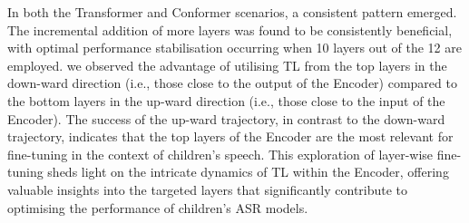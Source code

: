 In both the Transformer and Conformer scenarios, a consistent pattern emerged. The incremental addition of more layers was found to be consistently beneficial, with optimal performance stabilisation occurring when 10 layers out of the 12 are employed. we observed the advantage of utilising TL from the top layers in the down-ward direction (i.e., those close to the output of the Encoder) compared to the bottom layers in the up-ward direction (i.e., those close to the input of the Encoder). The success of the up-ward trajectory, in contrast to the down-ward trajectory, indicates that the top layers of the Encoder are the most relevant for fine-tuning in the context of children's speech. This exploration of layer-wise fine-tuning sheds light on the intricate dynamics of TL within the Encoder, offering valuable insights into the targeted layers that significantly contribute to optimising the performance of children's ASR models. 
